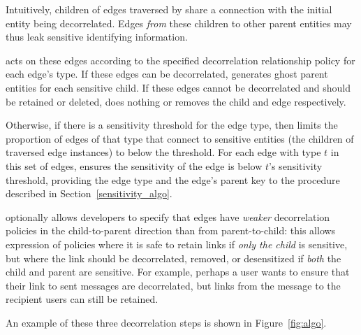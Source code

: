 \begin{enumerate}
        Intuitively, children of edges traversed by \sys share a connection with the initial
        entity being decorrelated. Edges \emph{from} these children to other parent entities may
        thus leak sensitive identifying information. 

        \sys acts on these edges according to the specified decorrelation relationship policy for
        each edge's type. If these edges can be decorrelated, \sys generates ghost parent entities
        for each sensitive child.  If these edges cannot be decorrelated and should be retained or
        deleted, \sys does nothing or removes the child and edge respectively. 
        
        Otherwise, if there is a sensitivity threshold for the edge type, then \sys limits the
        proportion of edges of that type that connect to sensitive entities (the children of
        traversed edge instances) to below the threshold. 
        For each edge with type $t$ in this set of edges, \sys ensures the
        sensitivity of the edge is below $t$'s sensitivity threshold, providing the edge type and the edge's
        parent key to the procedure described in Section~\ref{sensitivity_algo}. 

        \sys optionally allows developers to specify that edges have \emph{weaker}
        decorrelation policies in the child-to-parent direction than from parent-to-child: this
        allows expression of policies where it is safe to retain links if \emph{only the child} is
        sensitive, but where the link should be decorrelated, removed, or desensitized if
        \emph{both} the child
        and parent are sensitive. For example, perhaps a user wants to ensure that their link to
        sent messages are decorrelated, but links from the message to the recipient users 
        can still be retained.
\end{enumerate}

An example of these three decorrelation steps is shown in Figure~\ref{fig:algo}.

